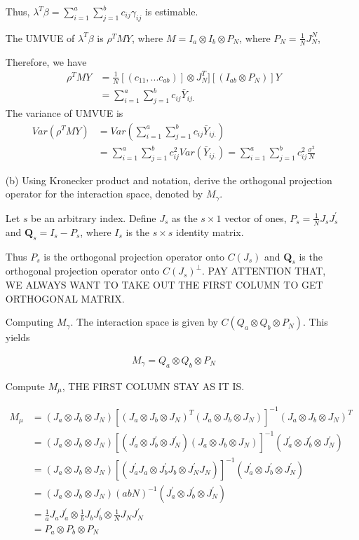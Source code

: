 \begin{itemize}
    Thus, $\lambda^T \beta = \sum_{i=1}^{a} \sum_{j=1}^{b} c_{ij}\gamma_{ij}$ is estimable.
    
    The UMVUE of $\lambda^T \beta$ is $\rho^T MY$, where $M= I_a \otimes I_b \otimes P_N$, where $P_N = \frac{1}{N} J_{N}^{N} $,  
    
    Therefore, we have
 \begin{align*}
    \rho^T MY &= \frac{1}{N} [(c_{11}, ... c_{ab})]\otimes J_N^T] [(I_{ab} \otimes P_N)] Y\\
    & = \sum_{i=1}^{a} \sum_{j=1}^{b} c_{ij}\bar{Y}_{ij.}
 \end{align*}
    The variance of UMVUE is
 \begin{align*}
    Var(\rho^T MY) &= Var(\sum_{i=1}^{a} \sum_{j=1}^{b} c_{ij}\bar{Y}_{ij.}) \\
    &=\sum_{i=1}^{a} \sum_{j=1}^{b} c_{ij}^2Var(\bar{Y}_{ij.}) = \sum_{i=1}^{a} \sum_{j=1}^{b} c_{ij}^2 \frac{\sigma^2}{N}
 \end{align*}
    
    \item[(b)] Using Kronecker product and notation, derive the orthogonal projection operator for the interaction space, denoted by $M_{\gamma}$.
    
    Let $s$ be an arbitrary index. Define $J_s$ as the $s \times 1$ vector of ones, $P_s = \frac{1}{N} J_s J_s^{'}$ and $\mathbf{Q}_s = I_s -P_s$, where $I_s$ is the $s \times s$ identity matrix. 
    
    Thus $P_s$ is the orthogonal projection operator onto $C(J_s)$ and $\mathbf{Q}_s$ is the orthogonal projection operator onto $C(J_s)^{\perp}$. PAY ATTENTION THAT, WE ALWAYS WANT TO TAKE OUT THE FIRST COLUMN TO GET ORTHOGONAL MATRIX.
      
    Computing $M_\gamma$. The interaction space is given by $C(Q_a \otimes Q_b \otimes P_N)$. This yields
    
 \begin{align*}
    M_\gamma = Q_a \otimes Q_b \otimes P_N
 \end{align*}
 
    Compute $M_\mu$, THE FIRST COLUMN STAY AS IT IS. 
    
 \begin{align*}
    M_\mu &= (J_a \otimes J_b \otimes J_N) [(J_a \otimes J_b \otimes J_N)^{T}(J_a \otimes J_b \otimes J_N)]^{-1} (J_a \otimes J_b \otimes J_N)^{T}\\
     &= (J_a \otimes J_b \otimes J_N) [(J_a ^{'}\otimes J_b^{'} \otimes J_N^{'})(J_a \otimes J_b \otimes J_N)]^{-1} (J_a^{'} \otimes J_b^{'} \otimes J_N^{'})\\
     &= (J_a \otimes J_b \otimes J_N) [(J_a ^{'}J_a\otimes J_b^{'}J_b \otimes J_N^{'}J_N)]^{-1}(J_a^{'} \otimes J_b^{'} \otimes J_N^{'})\\
     &= (J_a \otimes J_b \otimes J_N) (abN)^{-1} (J_a^{'} \otimes J_b^{'} \otimes J_N^{'})\\
     &= \frac{1}{a}J_aJ_a^{'} \otimes \frac{1}{b}J_bJ_b^{'} \otimes \frac{1}{N}J_NJ_N^{'} \\
     &= P_a \otimes P_b \otimes P_N
 \end{align*}
    

\end{itemize}
